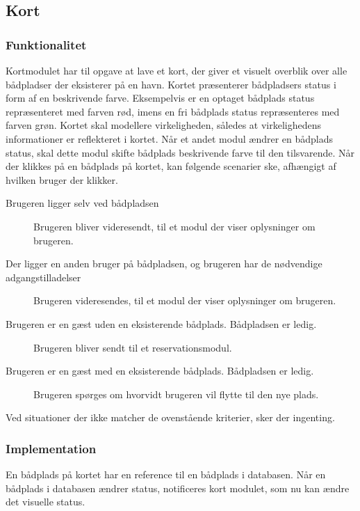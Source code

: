 \subsection{Kort}
\label{sub:kort}

\subsubsection{Funktionalitet}
\label{ssub:kort_funktionalitet}

Kortmodulet har til opgave at lave et kort, der giver et visuelt overblik over alle bådpladser der eksisterer på en havn. Kortet præsenterer bådpladsers status i form af en beskrivende farve. Eksempelvis er en optaget bådplads status repræsenteret med farven rød, imens en fri bådplads status repræsenteres med farven grøn. Kortet skal modellere virkeligheden, således at virkelighedens informationer er reflekteret i kortet. Når et andet modul ændrer en bådplads status, skal dette modul skifte bådplads beskrivende farve til den tilsvarende. Når der klikkes på en bådplads på kortet, kan følgende scenarier ske, afhængigt af hvilken bruger der klikker.

\begin{description}
  \item[Brugeren ligger selv ved bådpladsen] Brugeren bliver videresendt, til et modul der viser oplysninger om brugeren.
  \item[Der ligger en anden bruger på bådpladsen, og brugeren har de nødvendige adgangstilladelser] Brugeren videresendes, til et modul der viser oplysninger om brugeren.
  \item[Brugeren er en gæst uden en eksisterende bådplads. Bådpladsen er ledig.] Brugeren bliver sendt til et reservationsmodul.
  \item[Brugeren er en gæst med en eksisterende bådplads. Bådpladsen er ledig.] Brugeren spørges om hvorvidt brugeren vil flytte til den nye plads.
\end{description}

Ved situationer der ikke matcher de ovenstående kriterier, sker der ingenting.

\subsubsection{Implementation}
\label{ssub:kort_implementation}

En bådplads på kortet har en reference til en bådplads i databasen. Når en bådplads i databasen ændrer status, notificeres kort modulet, som nu kan ændre det visuelle status.


